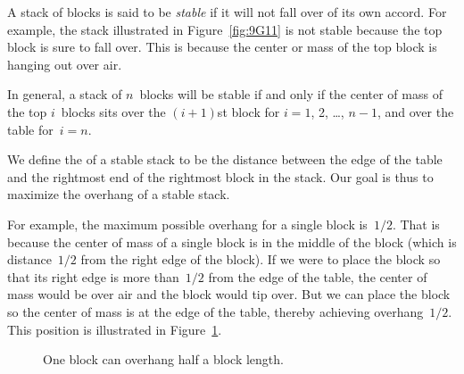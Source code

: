 A stack of blocks is said to be \emph{stable} if it will not fall over
of its own accord.  For example, the stack illustrated in
Figure~\ref{fig:9G11} is not stable because the top block is sure to
fall over.  This is because the center or mass of the top block is
hanging out over air.

In general, a stack of $n$~blocks will be stable if and only if the
center of mass of the top $i$~blocks sits over the $(i + 1)$st block
for $i = 1$, 2, \dots, $n - 1$, and over the table for~$i = n$.

We define the  of a stable stack to be the distance
between the edge of the table and the rightmost end of the rightmost
block in the stack.  Our goal is thus to maximize the overhang of a
stable stack.

For example, the maximum possible overhang for a single block
is~$1/2$.  That is because the center of mass of a single block is in
the middle of the block (which is distance~$1/2$ from the right edge
of the block).  If we were to place the block so that its right edge
is more than~$1/2$ from the edge of the table, the center of mass
would be over air and the block would tip over.  But we can place the
block so the center of mass is at the edge of the table, thereby
achieving overhang~$1/2$.  This position is illustrated in
Figure~\ref{fig:one-stable-block}.

\begin{figure}


\caption{One block can overhang half a block length.}

\label{fig:one-stable-block}

\end{figure}

\fi
